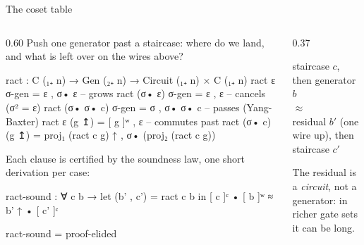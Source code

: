 \begin{frame}{The coset table  \InPaper}
\begin{columns}[c]
\begin{column}{0.60\textwidth}
Push one generator past a staircase: where do we land, and what is left
over on the wires above?
\begin{code}
ract : C (₁₊ n) → Gen (₂₊ n) → Circuit (₁₊ n) × C (₁₊ n)
ract ε σ-gen = ε , σ• ε             -- grows
ract (σ• ε) σ-gen = ε , ε           -- cancels (σ² = ε)
ract (σ• σ• c) σ-gen = σ , σ• σ• c  -- passes (Yang-Baxter)
ract ε (g ↥) = [ g ]ʷ , ε           -- commutes past
ract (σ• c) (g ↥) = proj₁ (ract c g) ↑ , σ• (proj₂ (ract c g))
\end{code}
Each clause is certified by the \alert{soundness law}, one short derivation per case:
\begin{code}
ract-sound : ∀ c b → let (b' , c') = ract c b in
             [ c ]ᶜ • [ b ]ʷ ≈ b' ↑ • [ c' ]ᶜ
\end{code}
\begin{code}[hide]
ract-sound = proof-elided
\end{code}
\end{column}
\begin{column}{0.37\textwidth}
\centering
{}

\vspace{6pt}
\begin{keybox}
\small staircase $c$, then generator $b$\\
\quad$\approx$\\
residual $b'$ (one wire up), then staircase $c'$
\end{keybox}
\small The residual is a \emph{circuit}, not a generator: in richer
gate sets it can be long.
\end{column}
\end{columns}
\end{frame}

